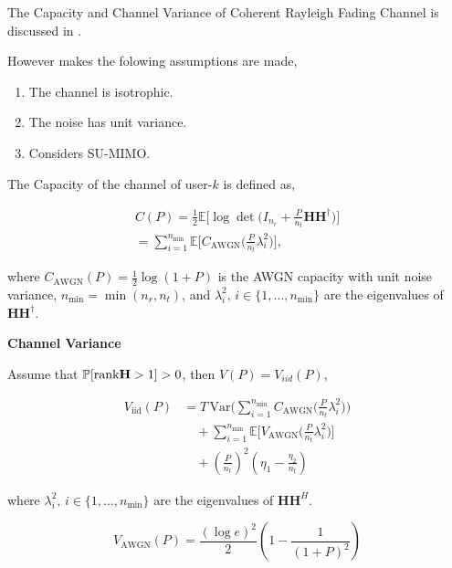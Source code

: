 \documentclass[a4paper, 12pt, onecolumn, journal, twoside, draftclsnofoot]{IEEEtran}
\begin{document}
The Capacity and Channel Variance of Coherent Rayleigh Fading Channel is discussed in \cite{collins2019}. 

However \cite{collins2019} makes the folowing assumptions are made,
 
\begin{enumerate}
\item The channel is isotrophic.
\item The noise has unit variance.
\item Considers SU-MIMO.
\end{enumerate}


The Capacity of the channel of user-$k$ is defined as, 

\begin{equation*}
\begin{gathered}
C(P) = \frac{1}{2} \mathbb{E} \Big[ \log \det \big( I_{n_r} + \frac{P}{n_t} \mathbf{H}\mathbf{H}^\dagger \big) \Big] \\
= \sum_{i=1}^{n_{\min}} \mathbb{E} \Big[ C_{\mathrm{AWGN}} \Big( \frac{P}{n_t} \lambda_i^2 \Big) \Big],
\end{gathered}
\end{equation*}

where \( C_{\mathrm{AWGN}}(P) = \frac{1}{2} \log(1+P) \) is the AWGN capacity with unit noise variance, \( n_{\min} = \min(n_r, n_t) \), and \( \lambda_i^2,\, i \in \{1, \ldots, n_{\min}\} \) are the eigenvalues of \( \mathbf{H} \mathbf{H}^\dagger \).


\newpage
\textbf{Channel Variance} 

Assume that $\mathbb{P}[\text{rank} {\bf H} > 1] > 0$, then $V (P) = V_{iid}(P)$, 

\begin{equation*}
\begin{aligned}
V_{\mathrm{iid}}(P) &= 
T \, \mathrm{Var} \Bigg( \sum_{i=1}^{n_{\min}} C_{\mathrm{AWGN}}\Big( \frac{P}{n_t} \lambda_i^2 \Big) \Bigg) \\
&\quad + \sum_{i=1}^{n_{\min}} \mathbb{E} \Big[ V_{\mathrm{AWGN}}\Big( \frac{P}{n_t} \lambda_i^2 \Big) \Big] \\
&\quad + \left( \frac{P}{n_t} \right)^2 \left( \eta_1 - \frac{\eta_2}{n_t} \right)
\end{aligned}
\end{equation*}

where \( \lambda_i^2,\, i \in \{1, \ldots, n_{\min}\} \) are the eigenvalues of \( \mathbf{H} \mathbf{H}^H \).

\begin{equation*}
V_{\mathrm{AWGN}}(P) = \frac{(\log e)^2}{2} \left( 1 - \frac{1}{(1+P)^2} \right)
\end{equation*}
\end{document}
